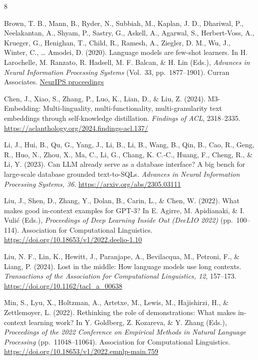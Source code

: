 \documentclass{article}
\begin{document}
\begin{thebibliography}{8}

Brown, T. B., Mann, B., Ryder, N., Subbiah, M., Kaplan, J. D., Dhariwal, P., Neelakantan, A.,
Shyam, P., Sastry, G., Askell, A., Agarwal, S., Herbert-Voss, A., Krueger, G., Henighan, T.,
Child, R., Ramesh, A., Ziegler, D. M., Wu, J., Winter, C., \ldots{} Amodei, D. (2020).
Language models are few-shot learners. In H. Larochelle, M. Ranzato, R. Hadsell, M. F. Balcan,
\& H. Lin (Eds.), \emph{Advances in Neural Information Processing Systems}
(Vol.~33, pp.~1877--1901). Curran Associates.
\href{https://proceedings.neurips.cc/paper_files/paper/2020/hash/1457c0d6bfcb4967418bfb8ac142f64a-Abstract.html}{NeurIPS proceedings}

Chen, J., Xiao, S., Zhang, P., Luo, K., Lian, D., \& Liu, Z. (2024). M3-Embedding: Multi-linguality,
multi-functionality, multi-granularity text embeddings through self-knowledge distillation.
\emph{Findings of ACL}, 2318--2335.
\url{https://aclanthology.org/2024.findings-acl.137/}

Li, J., Hui, B., Qu, G., Yang, J., Li, B., Li, B., Wang, B., Qin, B., Cao, R., Geng, R., Huo, N.,
Zhou, X., Ma, C., Li, G., Chang, K. C.-C., Huang, F., Cheng, R., \& Li, Y. (2023). Can LLM already
serve as a database interface? A big bench for large-scale database grounded text-to-SQLs.
\emph{Advances in Neural Information Processing Systems, 36}.
\url{https://arxiv.org/abs/2305.03111}

Liu, J., Shen, D., Zhang, Y., Dolan, B., Carin, L., \& Chen, W. (2022). What makes good in-context
examples for GPT-3? In E. Agirre, M. Apidianaki, \& I. Vuli\'{c} (Eds.),
\emph{Proceedings of Deep Learning Inside Out (DeeLIO 2022)} (pp.~100--114).
Association for Computational Linguistics. \url{https://doi.org/10.18653/v1/2022.deelio-1.10}

Liu, N. F., Lin, K., Hewitt, J., Paranjape, A., Bevilacqua, M., Petroni, F., \& Liang, P. (2024).
Lost in the middle: How language models use long contexts. \emph{Transactions of the Association
for Computational Linguistics, 12}, 157--173.
\url{https://doi.org/10.1162/tacl_a_00638}

Min, S., Lyu, X., Holtzman, A., Artetxe, M., Lewis, M., Hajishirzi, H., \& Zettlemoyer, L. (2022).
Rethinking the role of demonstrations: What makes in-context learning work?
In Y. Goldberg, Z. Kozareva, \& Y. Zhang (Eds.), \emph{Proceedings of the 2022 Conference on
Empirical Methods in Natural Language Processing} (pp.~11048--11064).
Association for Computational Linguistics. \url{https://doi.org/10.18653/v1/2022.emnlp-main.759}


\end{thebibliography}
\end{document}
